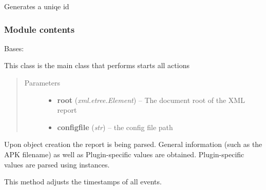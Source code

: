 \documentclass[letterpaper,10pt,english]{sphinxmanual}
\begin{document}

\begin{fulllineitems}
\label{ambrosia.util:ambrosia.util.unique_id}
Generates a uniqe id

\end{fulllineitems}



\subsubsection{Module contents}
\label{ambrosia:module-contents}\label{ambrosia:module-ambrosia}

\begin{fulllineitems}
\label{ambrosia:ambrosia.Ambrosia}
Bases: 

This class is the main class that performs starts all actions
\begin{quote}\begin{description}
\item[{Parameters}] \leavevmode\begin{itemize}
\item {} 
\textbf{root} (\emph{xml.etree.Element}) -- The document root of the XML report

\item {} 
\textbf{configfile} (\emph{str}) -- the config file path

\end{itemize}

\end{description}\end{quote}

Upon object creation the report is being parsed. General information (such as the APK filename) as well as
Plugin-specific values are obtained. Plugin-specific values are parsed using {\hyperref[ambrosia:ambrosia.ResultParser]{}} instances.

\begin{fulllineitems}
\label{ambrosia:ambrosia.Ambrosia.adjust_times}
This method adjusts the timestamps of all events.


\end{fulllineitems}
\end{fulllineitems}
\end{document}
